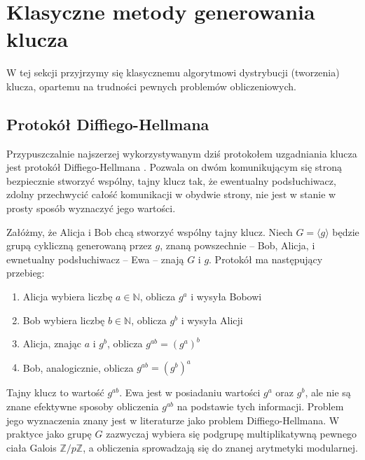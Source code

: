 \documentclass[10pt]{article}
\begin{document}

\section{Klasyczne metody generowania klucza}

W tej sekcji przyjrzymy się klasycznemu algorytmowi dystrybucji (tworzenia) klucza, opartemu
na trudności pewnych problemów obliczeniowych.

\subsection{Protokół Diffiego-Hellmana}

Przypuszczalnie najszerzej wykorzystywanym dziś protokołem uzgadniania klucza jest protokół 
Diffiego-Hellmana \cite{dh76}. Pozwala on dwóm komunikującym się stroną bezpiecznie stworzyć wspólny, 
tajny klucz tak, że ewentualny podsłuchiwacz, zdolny przechwycić całość komunikacji w obydwie strony,
nie jest w stanie w prosty sposób wyznaczyć jego wartości.

Załóżmy, że Alicja i Bob chcą stworzyć wspólny tajny klucz. Niech \(G=\langle g\rangle\) będzie grupą
cykliczną generowaną przez \(g\), znaną powszechnie -- Bob, Alicja, i ewnetualny podsłuchiwacz -- Ewa
-- znają \(G\) i \(g\). Protokół ma następujący przebieg:

\begin{enumerate}
  \item Alicja wybiera liczbę \(a\in\mathbb{N}\), oblicza \(g^a\) i wysyła Bobowi
  \item Bob wybiera liczbę \(b\in\mathbb{N}\), oblicza \(g^b\) i wysyła Alicji
  \item Alicja, znając \(a\) i \(g^b\), oblicza \(g^{ab}=\left(g^a\right)^b\)
  \item Bob, analogicznie, oblicza \(g^{ab}=\left(g^b\right)^a\)
\end{enumerate}

Tajny klucz to wartość \(g^{ab}\). Ewa jest w posiadaniu wartości \(g^a\) oraz \(g^b\), ale nie są
znane efektywne sposoby obliczenia \(g^{ab}\) na podstawie tych informacji. Problem jego wyznaczenia
znany jest w literaturze jako problem Diffiego-Hellmana\footnotemark. W praktyce jako grupę \(G\)
zazwyczaj wybiera się podgrupę multiplikatywną pewnego ciała Galois \(\mathbb{Z}/p\mathbb{Z}\), a
obliczenia sprowadzają się do znanej arytmetyki modularnej.
\end{document}
